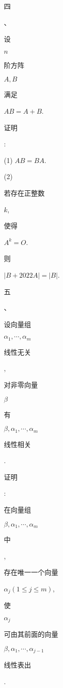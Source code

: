 \documentclass[10pt]{article}
\begin{document}
\begin{CJK}{UTF8}{mj}四\end{CJK}、\begin{CJK}{UTF8}{mj}设\end{CJK} $n$ \begin{CJK}{UTF8}{mj}阶方阵\end{CJK} $A, B$ \begin{CJK}{UTF8}{mj}满足\end{CJK} $A B=A+B$. \begin{CJK}{UTF8}{mj}证明\end{CJK}:

(1) $A B=B A$.

(2) \begin{CJK}{UTF8}{mj}若存在正整数\end{CJK} $k$, \begin{CJK}{UTF8}{mj}使得\end{CJK} $A^{k}=O$. \begin{CJK}{UTF8}{mj}则\end{CJK} $|B+2022 A|=|B|$.

\begin{CJK}{UTF8}{mj}五\end{CJK}、\begin{CJK}{UTF8}{mj}设向量组\end{CJK} $\alpha_{1}, \cdots, \alpha_{m}$ \begin{CJK}{UTF8}{mj}线性无关\end{CJK}, \begin{CJK}{UTF8}{mj}对非零向量\end{CJK} $\beta$ \begin{CJK}{UTF8}{mj}有\end{CJK} $\beta, \alpha_{1}, \cdots, \alpha_{m}$ \begin{CJK}{UTF8}{mj}线性相关\end{CJK}. \begin{CJK}{UTF8}{mj}证明\end{CJK}: \begin{CJK}{UTF8}{mj}在向量组\end{CJK} $\beta, \alpha_{1}, \cdots, \alpha_{m}$ \begin{CJK}{UTF8}{mj}中\end{CJK}, \begin{CJK}{UTF8}{mj}存在唯一一个向量\end{CJK} $\alpha_{j}(1 \leq j \leq m)$, \begin{CJK}{UTF8}{mj}使\end{CJK} $\alpha_{j}$ \begin{CJK}{UTF8}{mj}可由其前面的向量\end{CJK} $\beta, \alpha_{1}, \cdots, \alpha_{j-1}$ \begin{CJK}{UTF8}{mj}线性表出\end{CJK}.
\end{document}
